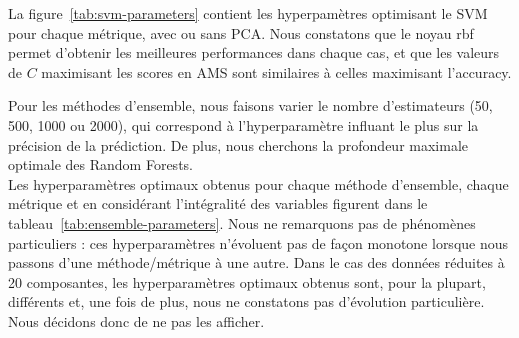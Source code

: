 \documentclass[12pt]{article}
\newcommand{\figref}[1]{figure~\ref{#1}}
\newcommand{\tabref}[1]{tableau~\ref{#1}}
\begin{document}
La \figref{tab:svm-parameters} contient les hyperpamètres optimisant le SVM pour
chaque métrique, avec ou sans PCA. Nous constatons que le noyau rbf permet
d'obtenir les meilleures performances dans chaque cas, et que les valeurs de $C$
maximisant les scores en AMS sont similaires à celles maximisant l'accuracy.\\


\begin{table}[H]
    \centering
    \caption{Paramètres optimaux pour le SVM}
    \label{tab:svm-parameters}
\end{table}

Pour les méthodes d'ensemble, nous faisons varier le nombre d'estimateurs (50,
500, 1000 ou 2000), qui correspond à l'hyperparamètre influant le plus sur la
précision de la prédiction. De plus, nous cherchons la profondeur maximale
optimale des Random Forests.  \\

Les hyperparamètres optimaux obtenus pour chaque méthode d'ensemble, chaque
métrique et en considérant l'intégralité des variables figurent dans le
\tabref{tab:ensemble-parameters}. Nous ne remarquons pas de phénomènes
particuliers : ces hyperparamètres n'évoluent pas de façon monotone lorsque nous
passons d'une méthode/métrique à une autre.  Dans le cas des données réduites à
20 composantes, les hyperparamètres optimaux obtenus sont, pour la plupart,
différents et, une fois de plus, nous ne constatons pas d'évolution
particulière. Nous décidons donc de ne pas les afficher. \\
\end{document}
